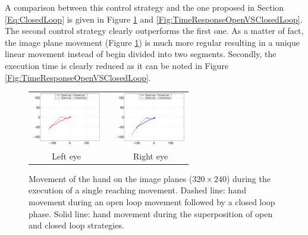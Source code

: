 A comparison between this control strategy and the one proposed in Section \ref{Eq:ClosedLoop}
is given in Figure \ref{Fig:TimeResponseOpenVSClosedLoopErrors} and \ref{Fig:TimeResponseOpenVSClosedLoop}. 
The second control strategy clearly outperforms the first one. As a matter of fact, the image plane movement (Figure \ref{Fig:TimeResponseOpenVSClosedLoopErrors})
is much more regular resulting in a unique linear movement instead of begin divided into two segments. Secondly, the
execution time is clearly reduced as it can be noted in Figure \ref{Fig:TimeResponseOpenVSClosedLoop}.


\begin{figure}
  \begin{center}
	\begin{tabular}{ccc}
	  \parbox{30mm}{\includegraphics[width=30mm]{Figure/LeftEyeOpenVSClosedLoop.eps}}  & \hspace{.1cm} &
	  \parbox{30mm}{\includegraphics[width=30mm]{Figure/RightEyeOpenVSClosedLoop.eps}}
	  \\
	  \parbox{30mm}{\centering Left eye } & \hspace{.1cm} & \parbox{30mm}{\centering Right eye }
  \end{tabular}
\end{center}
\caption{Movement of the hand on the image planes ($320 \times 240$)
during the execution of a single reaching movement. Dashed line: hand movement
during an open loop movement followed by a closed loop phase. Solid line: hand movement during 
the superposition of open and closed loop strategies.}\label{Fig:TimeResponseOpenVSClosedLoopErrors}
  \end{figure}
  

